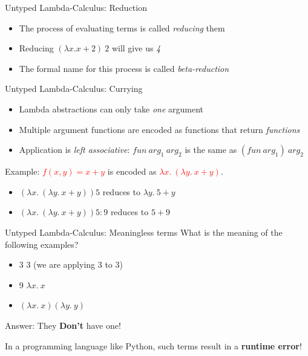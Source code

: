 \documentclass[pdf]{beamer}
\newcommand{\code}[1]{\textcolor{Red}{\textsf{#1}}}
\begin{document}
\begin{frame}{Untyped Lambda-Calculus: Reduction}
  \begin{itemize}
  \item The process of evaluating terms is called \emph{reducing} them
  \item Reducing $(\lambda x. x + 2) \: 2$ will give us \emph{4}
  \item The formal name for this process is called \textit{beta-reduction}
  \end{itemize}
\end{frame}

\begin{frame}{Untyped Lambda-Calculus: Currying}
  \begin{itemize}
  \item Lambda abstractions can only take \emph{one} argument
  \item Multiple argument functions are encoded as functions that return \emph{functions}
  \item Application is \emph{left associative}: $fun \: arg_{1} \: arg_{2}$ is the same as $(fun \: arg_{1}) \: arg_{2}$
  \end{itemize}

  Example: \code{$f(x,y) = x + y$} is encoded as \code{$\lambda x. \: (\lambda y. \: x + y)$}.

  \begin{itemize}
  \item $(\lambda x. \: (\lambda y. \: x + y)) 5$ reduces to $\lambda y. \: 5 + y$
  \item $(\lambda x. \: (\lambda y. \: x + y)) 5 : 9$ reduces to $5 + 9$
  \end{itemize}

\end{frame}

\begin{frame}{Untyped Lambda-Calculus: Meaningless terms}
  What is the meaning of the following examples?
  \begin{itemize}
  \item 3 3 (we are applying 3 to 3)
  \item 9 $\lambda x. \: x$
  \item $(\lambda x. \: x) (\lambda y. \: y)$
  \end{itemize}
  Answer: They \textbf{Don't} have one!

  In a programming language like Python, such terms result in a \textbf{runtime error}!
\end{frame}
\end{document}
